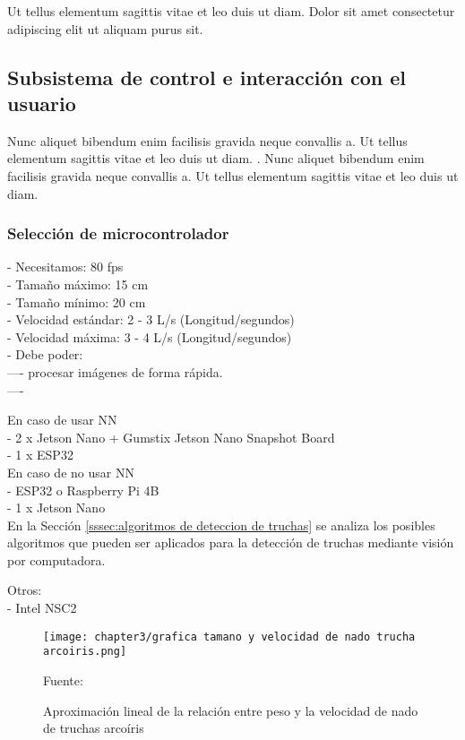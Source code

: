 Ut tellus elementum sagittis vitae et leo duis ut diam. Dolor sit amet consectetur adipiscing elit ut aliquam purus sit.

\subsection{Subsistema de control e interacción con el usuario}

Nunc aliquet bibendum enim facilisis gravida neque convallis a. Ut tellus elementum sagittis vitae et leo duis ut diam. . Nunc aliquet bibendum enim facilisis gravida neque convallis a. Ut tellus elementum sagittis vitae et leo duis ut diam. 


\subsubsection{Selección de microcontrolador}
\label{sssec:seleccion de microcontrolador}

- Necesitamos: 80 fps \\
- Tamaño máximo: 15 cm \\
- Tamaño mínimo: 20 cm \\
- Velocidad estándar: 2 - 3 L/s (Longitud/segundos) \\
- Velocidad máxima: 3 - 4 L/s (Longitud/segundos) \\
- Debe poder: \\
---- procesar imágenes de forma rápida. \\
----  

En caso de usar NN \\
- 2 x Jetson Nano + Gumstix Jetson Nano Snapshot Board \\
- 1 x ESP32 \\

En caso de no usar NN \\
- ESP32 o Raspberry Pi 4B \\
- 1 x Jetson Nano \\

En la Sección \ref{sssec:algoritmos de deteccion de truchas}  se analiza los posibles algoritmos que pueden ser aplicados para la detección de truchas mediante visión por computadora.

Otros:\\
- Intel NSC2 \\

\begin{figure}[H]
	\centering
	\texttt{[image: chapter3/grafica tamano y velocidad de nado trucha arcoiris.png]}
	\caption{Aproximación lineal de la relación entre peso y la velocidad de nado de truchas arcoíris}
	\begin{myflushleftportland}
		Fuente: \cite{Fry1970}
	\end{myflushleftportland}
	\label{fig:grafica tamano y velocidad de nado trucha arcoiris}
\end{figure}


